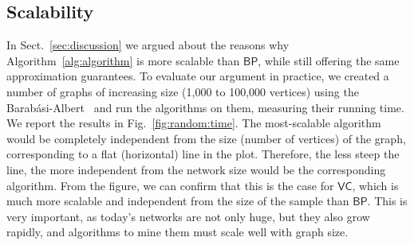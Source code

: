 \subsection{Scalability}\label{sec:scalability}
In Sect.~\ref{sec:discussion} we argued about the reasons why
Algorithm~\ref{alg:algorithm} is more scalable than $\mathsf{BP}$, while still
offering the same approximation guarantees. To evaluate our argument in practice, we
created a number of graphs of increasing size (1,000 to 100,000 vertices) using
the Barab\'asi-Albert~\citep{BarabasiA99} and run the algorithms on them,
measuring their running time. We report the results in Fig.~\ref{fig:random:time}.
The most-scalable algorithm would be completely independent from the size
(number of vertices) of the graph, corresponding to a flat (horizontal) line in
the plot. Therefore, the less steep the line, the more independent from the
network size would be the corresponding algorithm. From the figure, we can
confirm that this is the case for $\mathsf{VC}$, which is much more scalable
and independent from the size of the sample than $\mathsf{BP}$. This is very
important, as today's networks are not only huge, but they also grow rapidly,
and algorithms to mine them must scale well with graph size.

